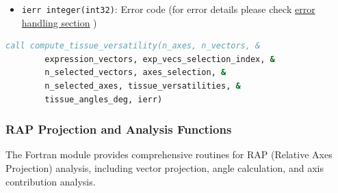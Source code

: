 \documentclass[11pt]{article}
\begin{document}
\begin{enumerate}
\begin{enumerate}
\begin{itemize}
	      	      	\item \texttt{ierr integer(int32)}: Error code (for error details
	      	      	      please check \hyperref[sec:error-handling]{error handling section}
	      	      	      )
	      	      \end{itemize}
	      	      \begin{lstlisting}[language=Fortran, caption={Tissue Versatility Calculation}]
call compute_tissue_versatility(n_axes, n_vectors, &
        expression_vectors, exp_vecs_selection_index, &
        n_selected_vectors, axes_selection, &
        n_selected_axes, tissue_versatilities, &
        tissue_angles_deg, ierr)
	      	      \end{lstlisting}
	      \end{enumerate}
\end{enumerate}

\subsubsection{RAP Projection and Analysis Functions}
The Fortran module provides comprehensive routines for RAP (Relative Axes Projection) analysis, including vector projection, angle calculation, and axis contribution analysis.
\end{document}
